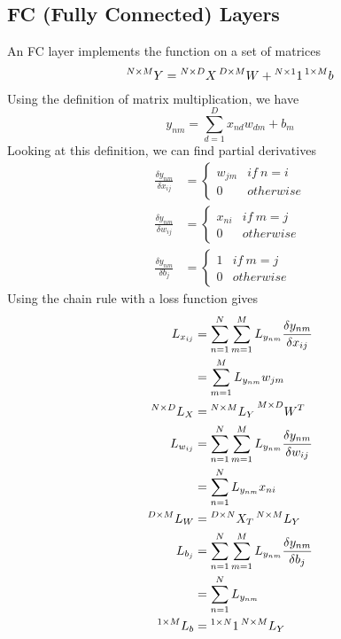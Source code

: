 \documentclass{article}
\numberwithin{equation}{subsection}
\begin{document}
\subsection{FC (Fully Connected) Layers}
An FC layer implements the function on a set of matrices
\begin{equation}
    \prescript{N\times M}{}{Y} = \prescript{N\times D}{}{X}\prescript{D\times M}{}{W} + \prescript{N\times1}{}{1}\prescript{1\times M}{}{b}
\end{equation}
Using the definition of matrix multiplication, we have
\begin{equation}
y_{nm} = \sum_{d=1}^D x_{nd} w_{dm}+b_m
\end{equation}
Looking at this definition, we can find partial derivatives 
\begin{align}
    \frac{\delta y_{nm}}{\delta x_{ij}} &= \begin{cases}
        w_{jm} & if\ n=i\\
        0 & otherwise
    \end{cases}\\
    \frac{\delta y_{nm}}{\delta w_{ij}} &= \begin{cases}
        x_{ni} & if\ m=j\\
        0 & otherwise
    \end{cases}\\
    \frac{\delta y_{nm}}{\delta b_{j}} &= \begin{cases}
        1 & if\ m=j\\
        0 & otherwise
    \end{cases}
\end{align}
Using the chain rule with a loss function gives
\begin{align}
    L_{x_{ij}} &= \sum_{n=1}^N\sum_{m=1}^M L_{y_{nm}} \frac{\delta y_{nm}}{\delta x_{ij}}\\
    &= \sum_{m=1}^M L_{y_{nm}} w_{jm}\\
    \prescript{N\times D}{}{L_X} &= \prescript{N\times M}{}{L_Y}\prescript{M\times D}{}{W^T}\\
    L_{w_{ij}} &= \sum_{n=1}^N\sum_{m=1}^M L_{y_{nm}} \frac{\delta y_{nm}}{\delta w_{ij}}\\
    &= \sum_{n=1}^N L_{y_{nm}} x_{ni}\\
    \prescript{D\times M}{}{L_W} &= \prescript{D\times N}{}{X_T}\prescript{N\times M}{}{L_Y}\\
    L_{b_{j}} &= \sum_{n=1}^N\sum_{m=1}^M L_{y_{nm}} \frac{\delta y_{nm}}{\delta b_{j}}\\
    &= \sum_{n=1}^N L_{y_{nm}}\\
    \prescript{1\times M}{}{L_b} &= \prescript{1\times N}{}{1}\prescript{N\times M}{}{L_Y}
\end{align}
\end{document}
